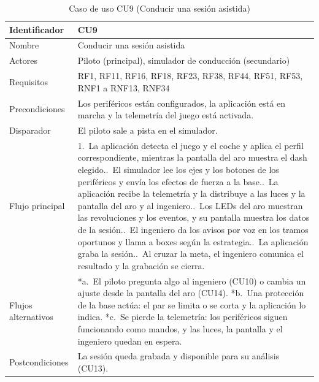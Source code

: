 \clearpage   %
\begin{table}[H]
	\centering
	\renewcommand{\arraystretch}{1.5}
	\begin{tabular}{|l|p{10cm}|}
		\hline
		Identificador & CU9 \\
		\hline
		Nombre & Conducir una sesión asistida \\
		\hline
		Actores & Piloto (principal), simulador de conducción (secundario) \\
		\hline
		Requisitos & RF1, RF11, RF16, RF18, RF23, RF38, RF44, RF51, RF53, RNF1 a RNF13, RNF34 \\
		\hline
		Precondiciones & Los periféricos están configurados, la aplicación está en marcha y la telemetría del juego está activada. \\
		\hline
		Disparador & El piloto sale a pista en el simulador. \\
		\hline
		Flujo principal & 1.~La aplicación detecta el juego y el coche y aplica el perfil correspondiente, mientras la pantalla del aro muestra el dash elegido.\newline
		2.~El simulador lee los ejes y los botones de los periféricos y envía los efectos de fuerza a la base.\newline
		3.~La aplicación recibe la telemetría y la distribuye a las luces y la pantalla del aro y al ingeniero.\newline
		4.~Los LEDs del aro muestran las revoluciones y los eventos, y su pantalla muestra los datos de la sesión.\newline
		5.~El ingeniero da los avisos por voz en los tramos oportunos y llama a boxes según la estrategia.\newline
		6.~La aplicación graba la sesión.\newline
		7.~Al cruzar la meta, el ingeniero comunica el resultado y la grabación se cierra. \\
		\hline
		Flujos alternativos & *a.~El piloto pregunta algo al ingeniero (CU10) o cambia un ajuste desde la pantalla del aro (CU14).\newline
		*b.~Una protección de la base actúa: el par se limita o se corta y la aplicación lo indica.\newline
		*c.~Se pierde la telemetría: los periféricos siguen funcionando como mandos, y las luces, la pantalla y el ingeniero quedan en espera. \\
		\hline
		Postcondiciones & La sesión queda grabada y disponible para su análisis (CU13). \\
		\hline
	\end{tabular}
	\caption{Caso de uso CU9 (Conducir una sesión asistida)}
	\label{tab:cu9}
\end{table}

